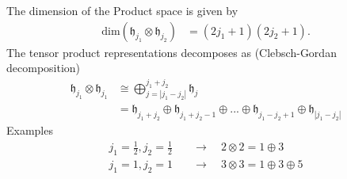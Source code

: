 \documentclass[10pt,a4paper]{book}
\theoremstyle{definition}
\begin{document}
The dimension of the Product space is given by
\begin{align}
\text{dim}(\mathfrak{h}_{j_1} \otimes \mathfrak{h}_{j_2})&=(2j_1+1)(2j_2+1).
\end{align}
The tensor product representations decomposes as ({\sc Clebsch-Gordan} decomposition)
\begin{align}
    \mathfrak{h}_{j_1} \otimes \mathfrak{h}_{j_1} &\cong \bigoplus_{j=|j_1-j_2|}^{j_1+j_2} \mathfrak{h}_{j}\\
    &=\mathfrak{h}_{j_1+j_2}\oplus \mathfrak{h}_{j_1+j_2-1}\oplus ... \oplus \mathfrak{h}_{j_1-j_2+1}\oplus \mathfrak{h}_{|j_1-j_2|}
\end{align}
Examples
\begin{align}
j_1=\frac{1}{2}, j_2=\frac{1}{2}&\quad\rightarrow\quad 2\otimes2=1\oplus3\\
j_1=1, j_2=1&\quad\rightarrow\quad 3\otimes3=1\oplus3\oplus5
\end{align}
\end{document}

